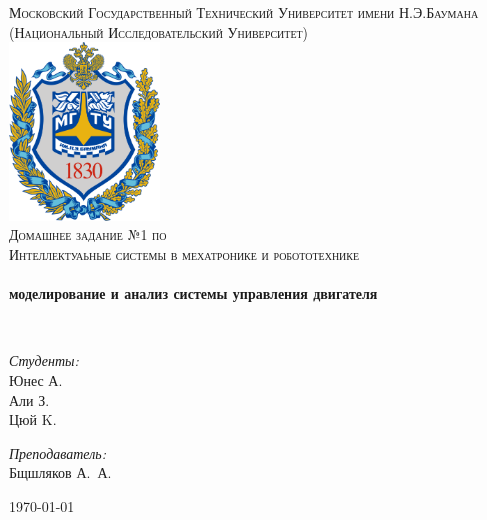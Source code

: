 \begin{titlepage}
\begin{center}

\textsc{\Large Московский Государственный Технический Университет имени Н.Э.Баумана}\\
\textsc{\large (Национальный Исследовательский Университет)}\\[1.5cm]

\includegraphics[width=0.3\textwidth]{img/logo.png}~\\[1cm]

\textsc{\Large Домашнее задание №1 по \\ Интеллектуаьные системы в мехатронике и робототехнике}\\[0.5cm]

\HRule \\[0.4cm]
{ \LARGE \bfseries  моделирование и анализ системы управления двигателя\\ [0.4cm] }

\HRule \\[1.5cm]

\noindent
\begin{minipage}{0.4\textwidth}
\begin{flushleft} \large
\emph{Студенты:}\\
Юнес \textsc{А.}\\
Али  \textsc{З.}\\
Цюй \textsc{K.}
\end{flushleft}
\end{minipage}%
\begin{minipage}{0.4\textwidth}
\begin{flushright} \large
\emph{Преподаватель:} \\
Бщшляков \textsc{А.~А.}
\end{flushright}
\end{minipage}

\vfill

{\large \today}

\end{center}
\end{titlepage}